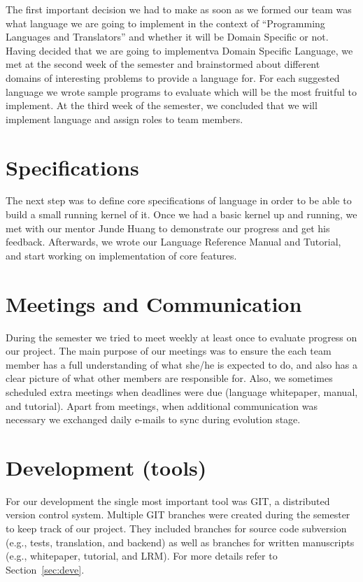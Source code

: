 The first important decision we had to make as soon as we formed
our team was what language we are going to implement in the context of
``Programming Languages and Translators'' and whether it will be Domain
Specific or not. Having decided that we are going to implementva Domain
Specific Language, we met at the second week of the semester and brainstormed
about different domains of interesting problems to provide a language for.
For each suggested language we wrote sample programs to evaluate which will be
the most fruitful to implement. At the third week of the semester, we concluded
that we will implement \lang{} language and assign roles to team members.

\section{Specifications}
The next step was to define core specifications of \lang{} language in order to
be able to build a small running kernel of it. Once we had a basic kernel up
and running, we met with our mentor Junde Huang to demonstrate our progress
and get his feedback. Afterwards, we wrote our Language Reference Manual and
Tutorial, and start working on implementation of core features.

\section{Meetings and Communication}
During the semester we tried to meet weekly at least once to evaluate progress
on our project. The main purpose of our meetings was to ensure the each team
member has a full understanding of what she/he is expected to do, and also has a
clear picture of what other members are responsible for. Also, we
sometimes scheduled extra meetings when deadlines were due (language whitepaper,
manual, and tutorial). Apart from meetings, when additional communication was
necessary we exchanged daily e-mails to sync during evolution stage.

\section{Development (tools)}
For our development the single most important tool was GIT, a distributed
version control system. Multiple GIT branches were created during the semester
to keep track of our project. They included branches for source code
subversion (e.g., tests, translation, and \lang{} backend) as well as
branches for written manuscripts (e.g., whitepaper, tutorial,  and LRM).
For more details refer to Section~\ref{sec:deve}.

